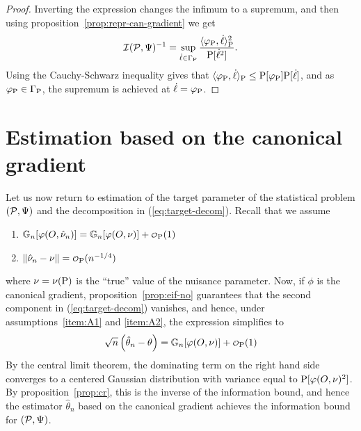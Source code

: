 \documentclass[a4,danish]{article}
\begin{document}
\begin{proof}
  Inverting the expression changes the infimum to a supremum, and then using
  proposition~\ref{prop:repr-can-gradient} we get
  \begin{equation*}
    \mathcal{I}(\mathcal{P}, \TT)^{-1} = 
    \sup_{\dot{\ell} \in \Gamma_{\P}}
    \frac{\langle\phi_{\P}, \dot{\ell} \rangle_{\P}^2}{\P[\dot{\ell}^2]}.
  \end{equation*}
  Using the Cauchy-Schwarz inequality gives that
  $\langle\phi_{\P}, \dot{\ell} \rangle_{\P} \leq \P[\phi_{\P}] \P[\dot{\ell}]$, and as
  $\phi_{\P} \in \Gamma_{\P}$, the supremum is achieved at $\dot{\ell}=\phi_{\P}$.
\end{proof}


 

\section{Estimation based on the canonical gradient}
\label{sec:estim-based-canon}

Let us now return to estimation of the target parameter of the statistical problem
$(\mathcal{P}, \TT)$ and the decomposition in (\ref{eq:target-decom}). Recall that we assume
\begin{enumerate}[label=(A\arabic*), ref=A\arabic*, topsep=0pt]
\item \label{item:A1} $\G{\phi(O,\hat{\nu}_n)} = \G{\phi(O,\nu)} + \smallO_{\P}(1)$
\item \label{item:A2} $\Vert \hat{\nu}_n - \nu\Vert = \smallO_{\P}(n^{-1/4})$
\end{enumerate}
where $\nu = \nu(\P)$ is the ``true'' value of the nuisance parameter. Now, if $\phi$ is the
canonical gradient, proposition~\ref{prop:eif-no} guarantees that the second component in
(\ref{eq:target-decom}) vanishes, and hence, under assumptions~\ref{item:A1} and \ref{item:A2}, the
expression simplifies to
\begin{equation*}
    \sqrt{n}
  \left(
    \hat{\theta}_n - \theta
  \right)
  = \G{\phi( O, \nu)} + \smallO_{\P}(1)
\end{equation*}
By the central limit theorem, the dominating term on the right hand side converges to a centered
Gaussian distribution with variance equal to $\P[\phi(O, \nu)^2]$. By proposition~\ref{prop:cr},
this is the inverse of the information bound, and hence the estimator $\hat{\theta}_n$ based on the
canonical gradient achieves the information bound for $(\mathcal{P}, \TT)$.
\end{document}
